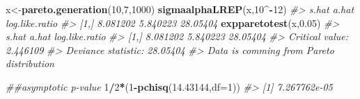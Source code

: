 \documentclass[
]{article}
\newenvironment{Shaded}{\begin{snugshade}}{\end{snugshade}}
\newcommand{\CommentTok}[1]{\textcolor[rgb]{0.56,0.35,0.01}{\textit{#1}}}
\newcommand{\DataTypeTok}[1]{\textcolor[rgb]{0.13,0.29,0.53}{#1}}
\newcommand{\DecValTok}[1]{\textcolor[rgb]{0.00,0.00,0.81}{#1}}
\newcommand{\FloatTok}[1]{\textcolor[rgb]{0.00,0.00,0.81}{#1}}
\newcommand{\KeywordTok}[1]{\textcolor[rgb]{0.13,0.29,0.53}{\textbf{#1}}}
\newcommand{\NormalTok}[1]{#1}
\newcommand{\OperatorTok}[1]{\textcolor[rgb]{0.81,0.36,0.00}{\textbf{#1}}}
\begin{document}
\begin{Shaded}
\begin{Highlighting}[]
\NormalTok{x<-}\KeywordTok{pareto.generation}\NormalTok{(}\DecValTok{10}\NormalTok{,}\DecValTok{7}\NormalTok{,}\DecValTok{1000}\NormalTok{)}
\KeywordTok{sigmaalphaLREP}\NormalTok{(x,}\DecValTok{10}\OperatorTok{^-}\DecValTok{12}\NormalTok{)}
\CommentTok{#>         s.hat    a.hat log.like.ratio}
\CommentTok{#> [1,] 8.081202 5.840223       28.05404}
\KeywordTok{expparetotest}\NormalTok{(x,}\FloatTok{0.05}\NormalTok{)}
\CommentTok{#>         s.hat    a.hat log.like.ratio}
\CommentTok{#> [1,] 8.081202 5.840223       28.05404}
\CommentTok{#> Critical value: 2.446109 }
\CommentTok{#> Deviance statistic: 28.05404 }
\CommentTok{#> Data is comming from Pareto distribution}

\CommentTok{##asymptotic p-value}
\DecValTok{1}\OperatorTok{/}\DecValTok{2}\OperatorTok{*}\NormalTok{(}\DecValTok{1}\OperatorTok{-}\KeywordTok{pchisq}\NormalTok{(}\FloatTok{14.43144}\NormalTok{,}\DataTypeTok{df=}\DecValTok{1}\NormalTok{))}
\CommentTok{#> [1] 7.267762e-05}
\end{Highlighting}
\end{Shaded}
\end{document}
